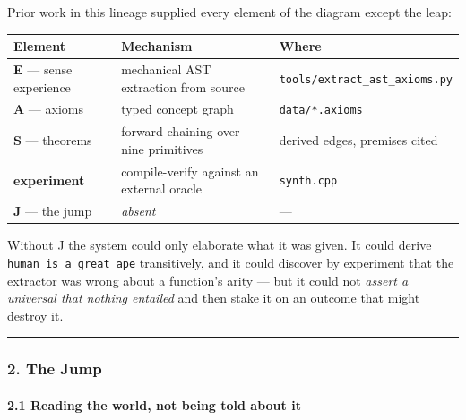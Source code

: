\documentclass[
  11pt,
  a4paper,
]{article}
\begin{document}
Prior work in this lineage supplied every element of the diagram except
the leap:

\begin{longtable}[]{@{}
  >{\raggedright\arraybackslash}p{}
  >{\raggedright\arraybackslash}p{}
  >{\raggedright\arraybackslash}p{}@{}}
\toprule\noalign{}
\begin{minipage}[b]{\linewidth}\raggedright
Element
\end{minipage} & \begin{minipage}[b]{\linewidth}\raggedright
Mechanism
\end{minipage} & \begin{minipage}[b]{\linewidth}\raggedright
Where
\end{minipage} \\
\midrule\noalign{}
\endhead
\bottomrule\noalign{}
\endlastfoot
\textbf{E} --- sense experience & mechanical AST extraction from source
& \texttt{tools/extract\_ast\_axioms.py} \\
\textbf{A} --- axioms & typed concept graph & \texttt{data/*.axioms} \\
\textbf{S} --- theorems & forward chaining over nine primitives & 100
derived edges, premises cited \\
\textbf{experiment} & compile-verify against an external oracle &
\texttt{synth.cpp} \\
\textbf{J} --- the jump & \emph{absent} & --- \\
\end{longtable}

Without J the system could only elaborate what it was given. It could
derive \texttt{human\ is\_a\ great\_ape} transitively, and it could
discover by experiment that the extractor was wrong about a function's
arity --- but it could not \emph{assert a universal that nothing
entailed} and then stake it on an outcome that might destroy it.

\begin{center}\rule{0.5\linewidth}{0.5pt}\end{center}

\subsubsection{2. The Jump}\label{the-jump}

\paragraph{2.1 Reading the world, not being told about
it}\label{reading-the-world-not-being-told-about-it}
\end{document}
